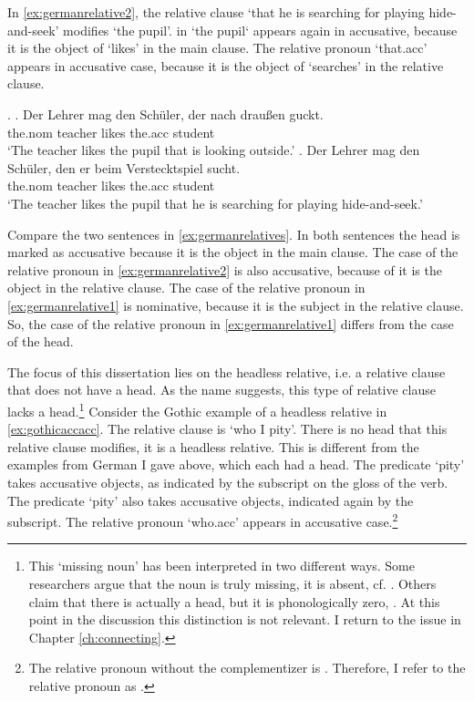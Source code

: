 In \ref{ex:germanrelative2}, the relative clause  `that he is searching for playing hide-and-seek' modifies  `the pupil'.  in  `the pupil` appears again in accusative, because it is the object of  `likes' in the main clause. The relative pronoun  `that.\ac{acc}' appears in accusative case, because it is the object of  `searches' in the relative clause.

\ex.\label{ex:germanrelatives}
\ag. Der Lehrer mag den Schüler, der nach draußen guckt.\\
 the.\ac{nom} teacher likes the.\ac{acc} student    \\
 `The teacher likes the pupil that is looking outside.'\label{ex:germanrelative1}
 \bg. Der Lehrer mag den Schüler, den er beim Verstecktspiel sucht.\\
 the.\ac{nom} teacher likes the.\ac{acc} student     \\
 `The teacher likes the pupil that he is searching for playing hide-and-seek.'\label{ex:germanrelative2}

Compare the two sentences in \ref{ex:germanrelatives}. In both sentences the head is marked as accusative because it is the object in the main clause. The case of the relative pronoun in \ref{ex:germanrelative2} is also accusative, because of it is the object in the relative clause. The case of the relative pronoun in \ref{ex:germanrelative1} is nominative, because it is the subject in the relative clause. So, the case of the relative pronoun in \ref{ex:germanrelative1} differs from the case of the head.

The focus of this dissertation lies on the headless relative, i.e. a relative clause that does not have a head. As the name suggests, this type of relative clause lacks a head.\footnote{
This `missing noun' has been interpreted in two different ways. Some researchers argue that the noun is truly missing, it is absent, cf. \citealt{vanriemsdijk2006}. Others claim that there is actually a head, but it is phonologically zero, \citealt{himmelreich2017}. At this point in the discussion this distinction is not relevant. I return to the issue in Chapter \ref{ch:connecting}.
}
Consider the Gothic example of a headless relative in \ref{ex:gothicaccacc}. The relative clause is  `who I pity'. There is no head that this relative clause modifies, it is a headless relative. This is different from the examples from German I gave above, which each had a head.
The predicate  `pity' takes accusative objects, as indicated by the subscript on the gloss of the verb. The predicate  `pity' also takes accusative objects, indicated again by the subscript.
The relative pronoun  `who.\ac{acc}' appears in accusative case.\footnote{
The relative pronoun without the complementizer  is . Therefore, I refer to the relative pronoun as .
}

